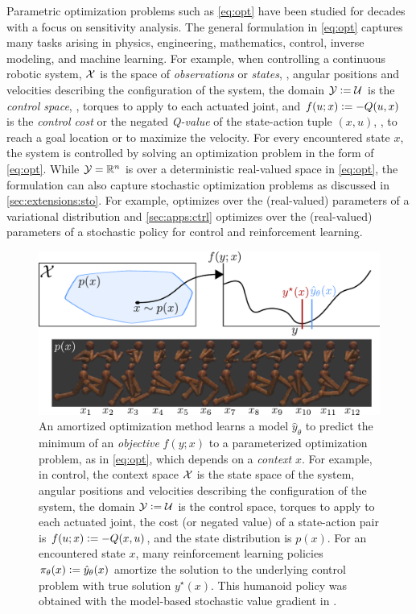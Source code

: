 Parametric optimization problems such as \cref{eq:opt}
have been studied for decades
\citep{bank1982non,fiacco1990sensitivity,shapiro2003sensitivity,klatte2006nonsmooth,bonnans2013perturbation,still2018lectures,fiacco2020mathematical}
with a focus on sensitivity analysis.
The general formulation in \cref{eq:opt} captures many
tasks arising in physics, engineering, mathematics, control,
inverse modeling, and machine learning.
For example, when controlling a continuous robotic system,
${\mathcal{X}}$ is the space of \emph{observations} or \emph{states},
\eg, angular positions and velocities describing
the configuration of the system,
the domain ${\mathcal{Y}}\vcentcolon= {\mathcal{U}}$ is the \emph{control space},
\eg, torques to apply to each actuated joint,
and $f(u; x)\vcentcolon= -Q(u, x)$ is the \emph{control cost}
or the negated \emph{Q-value} of the state-action tuple $(x,u)$,
\eg, to reach a goal location or to maximize the velocity.
For every encountered state $x$, the system is controlled
by solving an optimization problem in the form of \cref{eq:opt}.
While ${\mathcal{Y}}=\mathbb{R}^n$ is over a deterministic real-valued space
in \cref{eq:opt}, the formulation can also capture
stochastic optimization problems as discussed in
\cref{sec:extensions:sto}. For example,
 optimizes over the (real-valued)
parameters of a variational distribution and
\cref{sec:apps:ctrl} optimizes over the (real-valued)
parameters of a stochastic policy for control and
reinforcement learning.

\begin{figure}[t]
  \centering
  \includegraphics[width=\textwidth]{fig/overview.pdf}
  \caption{An amortized optimization method learns
    a model $\hat y_\theta$ to predict the minimum
    of an \emph{objective} $f(y;x)$ to a parameterized
    optimization problem, as in \cref{eq:opt},
    which depends on a \emph{context} $x$.
    For example, in control,
    the context space ${\mathcal{X}}$ is the state space of the system,
    \eg angular positions and velocities describing
    the configuration of the system,
    the domain ${\mathcal{Y}}\vcentcolon={\mathcal{U}}$ is the control space,
    \eg torques to apply to each actuated joint,
    the cost (or negated value) of a state-action
    pair is $f(u; x)\vcentcolon= -Q(x,u)$, and the state distribution is $p(x)$.
    For an encountered state $x$,
    many reinforcement learning policies $\pi_\theta(x)\vcentcolon=\hat y_\theta(x)$
    amortize the solution to the underlying control problem
    with true solution $y^\star(x)$.
    This humanoid policy was obtained with the model-based
    stochastic value gradient in \citet{amos2021model}.
  }
  \label{fig:overview}
\end{figure}


